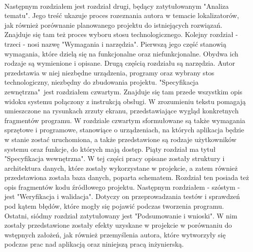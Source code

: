 \paragraph{}
Następnym rozdziałem jest rozdział drugi, będący zatytułowanym "Analiza tematu". Jego treść ukazuje proces rozeznania autora w temacie lokalizatorów, jak również porównanie planowanego projektu do istniejących rozwiązań. Znajduje się tam też proces wyboru stosu technologicznego. Kolejny rozdział - trzeci - nosi nazwę "Wymagania i narzędzia". Pierwszą jego część stanowią wymagania, które dzielą się na funkcjonalne oraz niefunkcjonalne. Obydwa ich rodzaje są wymienione i opisane. Drugą częścią rozdziału są narzędzia. Autor przedstawia w niej niezbędne urządzenia, programy oraz wybrany stos technologiczny, niezbędny do zbudowania projektu. "Specyfikacja zewnętrzna"\ jest rozdziałem czwartym. Znajduje się tam przede wszystkim opis widoku systemu połączony z instrukcją obsługi. W zrozumieniu tekstu pomagają umieszczone na rysunkach zrzuty ekranu, przedstawiające wygląd konkretnych fragmentów programu. W rozdziale czwartym sformułowane są także wymagania sprzętowe i programowe, stanowiące o urządzeniach, na których aplikacja będzie w stanie zostać uruchomiona, a także przedstawione są rodzaje użytkowników systemu oraz funkcje, do których mają dostęp. Piąty rozdział ma tytuł "Specyfikacja wewnętrzna". W tej części pracy opisane zostały struktury i architektura danych, które zostały wykorzystane w projekcie, a zatem również przedstawiona została baza danych, poparta schematem. Rozdział ten posiada też opis fragmentów kodu źródłowego projektu. Następnym rozdziałem - szóstym - jest "Weryfikacja i walidacja". Dotyczy on przeprowadzania testów i sprawdzeń pod kątem błędów, które mogły się pojawić podczas tworzenia programu. Ostatni, siódmy rozdział zatytułowany jest "Podsumowanie i wnioski". W nim zostały przedstawione zostały efekty uzyskane w projekcie w porównaniu do wstępnych założeń, jak również przemyślenia autora, które wytworzyły się podczas prac nad aplikacją oraz niniejszą pracą inżynierską.   